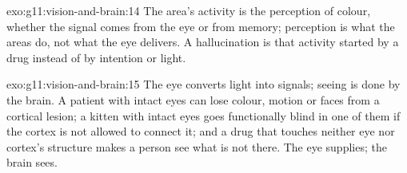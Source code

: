 \begin{solution}{exo:g11:vision-and-brain:14}
The area's activity is the perception of colour, whether the signal
comes from the eye or from memory; perception is what the areas do,
not what the eye delivers. A hallucination is that activity started
by a drug instead of by intention or light.
\end{solution}

\begin{solution}{exo:g11:vision-and-brain:15}
The eye converts light into signals; seeing is done by the brain. A
patient with intact eyes can lose colour, motion or faces from a
cortical lesion; a kitten with intact eyes goes functionally blind in
one of them if the cortex is not allowed to connect it; and a drug
that touches neither eye nor cortex's structure makes a person see
what is not there. The eye supplies; the brain sees.
\end{solution}

